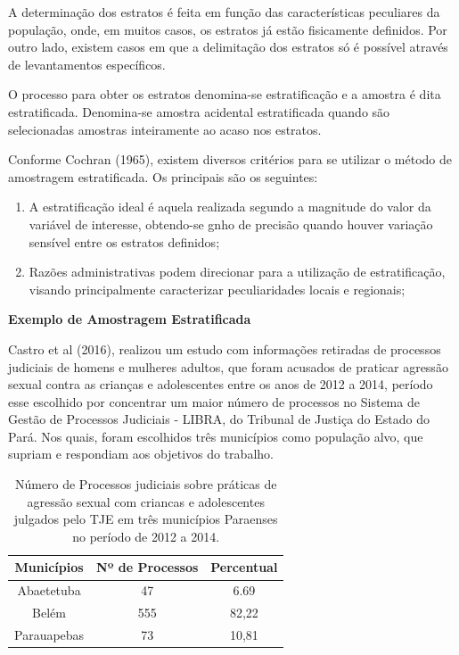 A determinação dos estratos é feita em função das características peculiares da população, onde, em muitos casos, os estratos já estão fisicamente definidos. Por outro lado, existem casos em que a delimitação dos estratos só é possível através de levantamentos específicos.\vskip0.3cm

O processo para obter os estratos denomina-se estratificação e a amostra é dita estratificada. Denomina-se amostra acidental estratificada quando são selecionadas amostras inteiramente ao acaso nos estratos.\vskip0.3cm

Conforme Cochran (1965), existem diversos critérios para se utilizar o método de amostragem estratificada. Os principais são os seguintes:


\begin{enumerate}
  \item[{1)}] A estratificação ideal é aquela realizada segundo a magnitude do valor da variável de interesse,
  obtendo-se gnho de precisão quando houver variação sensível entre os estratos definidos;
  \item[{2)}] Razões administrativas podem direcionar para a utilização de estratificação, visando
  principalmente caracterizar peculiaridades locais e regionais;
\end{enumerate}


\textbf{Exemplo de Amostragem Estratificada}
\vskip0.3cm

Castro et al (2016), realizou um estudo com informações retiradas de processos judiciais de homens e mulheres adultos, que foram acusados de praticar agressão sexual contra as crianças e adolescentes entre os anos de 2012 a 2014, período esse escolhido por concentrar um maior número de processos no Sistema de Gestão de Processos Judiciais - LIBRA, do Tribunal de Justiça do Estado do Pará. Nos quais, foram escolhidos três municípios como população alvo, que supriam e respondiam aos objetivos do trabalho.\vskip0.3cm


\newpage
\begin{table}[!htb]
    \centering
    {
    \caption{Número de Processos judiciais sobre práticas de agressão sexual com criancas e
adolescentes julgados pelo TJE em três municípios Paraenses no período de 2012 a 2014.}
    \label{amostras estratificada}
    \vspace{0.1cm}
\begin{tabular}{c|c|c}
  \hline\hline
  Municípios   & Nº de Processos &  Percentual \\
  \hline\hline
   Abaetetuba  & 47              & 6.69        \\
   Belém       & 555             & 82,22       \\
   Parauapebas & 73              & 10,81       \\
  \hline\hline
\end{tabular}}
\\
\hspace{-1.0cm}
\end{table}


